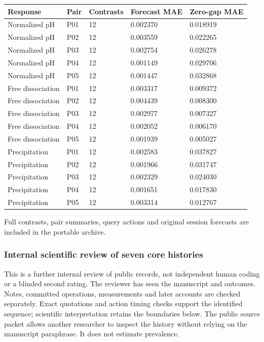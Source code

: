 \documentclass[10pt,a4paper]{article}
\begin{document}
{\def\LTcaptype{table} %
\small\begin{longtable}[]{@{}lllll@{}}
\toprule\noalign{}
Response & Pair & Contrasts & Forecast MAE & Zero-gap MAE \\
\midrule\noalign{}
\endhead
\bottomrule\noalign{}
\endlastfoot
Normalized pH & P01 & 12 & 0.002370 & 0.018919 \\
Normalized pH & P02 & 12 & 0.003559 & 0.022265 \\
Normalized pH & P03 & 12 & 0.002754 & 0.026278 \\
Normalized pH & P04 & 12 & 0.001149 & 0.029706 \\
Normalized pH & P05 & 12 & 0.001447 & 0.032868 \\
Free dissociation & P01 & 12 & 0.003317 & 0.009372 \\
Free dissociation & P02 & 12 & 0.004439 & 0.008300 \\
Free dissociation & P03 & 12 & 0.002977 & 0.007327 \\
Free dissociation & P04 & 12 & 0.002052 & 0.006170 \\
Free dissociation & P05 & 12 & 0.001939 & 0.005027 \\
Precipitation & P01 & 12 & 0.002583 & 0.037827 \\
Precipitation & P02 & 12 & 0.001966 & 0.031747 \\
Precipitation & P03 & 12 & 0.002329 & 0.024030 \\
Precipitation & P04 & 12 & 0.001651 & 0.017830 \\
Precipitation & P05 & 12 & 0.003314 & 0.012767 \\
\end{longtable}\normalsize
}

Full contrasts, pair summaries, query actions and original session forecasts are included in the portable archive.

\subsubsection{Internal scientific review of seven core histories}\label{internal-scientific-review-of-seven-core-histories}

This is a further internal review of public records, not independent human coding or a blinded second rating. The reviewer has seen the manuscript and outcomes. Notes, committed operations, measurements and later accounts are checked separately. Exact quotations and action timing checks support the identified sequence; scientific interpretation retains the boundaries below. The public source packet allows another researcher to inspect the history without relying on the manuscript paraphrase. It does not estimate prevalence.
\end{document}
